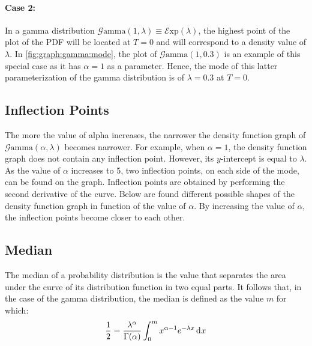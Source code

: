 \documentclass[12pt]{article}
\newcommand{\E}{\mathcal{E}}
\newcommand{\G}{\mathcal{G}}
\begin{document}
\paragraph{Case 2:}
In a gamma distribution $\G\text{amma}(1, \lambda)\equiv\E\text{xp}(\lambda)$, the highest point of the plot of the PDF
will be located at $T=0$ and will correspond to a density value of $\lambda$. In \autoref{fig:graph:gamma:mode}, the
plot of $\G\text{amma}(1, 0.3)$ is an example of this special case as it has $\alpha=1$ as a parameter. Hence, the mode
of this latter parameterization of the gamma distribution is of $\lambda=0.3$ at $T=0$.


\pagebreak
\subsection{Inflection Points}
The more the value of alpha increases, the narrower the density function graph of $\G\text{amma}(\alpha,\lambda)$
becomes narrower. For example, when $\alpha=1$, the density function graph does not contain any inflection point.
However, its $y$-intercept is equal to $\lambda$. As the value of $\alpha$ increases to 5, two inflection points, on
each side of the mode, can be found on the graph. Inflection points are obtained by performing the second derivative of
the curve. Below are found different possible shapes of the density function graph in function of the value of $\alpha$.
By increasing the value of $\alpha$, the inflection points become closer to each other.


\pagebreak
\subsection{Median}
The median of a probability distribution is the value that separates the area under the curve of its distribution
function in two equal parts. It follows that, in the case of the gamma distribution, the median is defined as the value
$m$ for which:
\begin{equation}
	\frac{1}{2} = \frac{\lambda^\alpha}{\Gamma(\alpha)} \int^m_0 x^{\alpha-1} e^{-\lambda x}\mathop{}\!\mathrm{d^{}}x
\end{equation}
\end{document}
